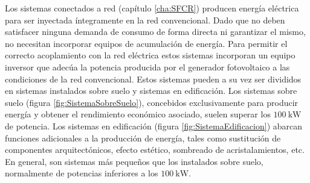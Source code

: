 Los sistemas conectados a red (capítulo \ref{cha:SFCR}) producen
energía eléctrica para ser inyectada íntegramente en la red convencional.
Dado que no deben satisfacer ninguna demanda de consumo de forma directa
ni garantizar el mismo, no necesitan incorporar equipos de acumulación
de energía. Para permitir el correcto acoplamiento con la red eléctrica
estos sistemas incorporan un equipo inversor que adecúa la potencia
producida por el generador fotovoltaico a las condiciones de la red
convencional. Estos sistemas pueden a su vez ser divididos en sistemas
instalados sobre suelo y sistemas en edificación. Los sistemas sobre
suelo (figura \ref{fig:SistemaSobreSuelo}), concebidos exclusivamente
para producir energía y obtener el rendimiento económico asociado,
suelen superar los $\SI{100}{\kilo\watt}$ de potencia. Los sistemas
en edificación (figura \ref{fig:SistemaEdificacion}) abarcan funciones
adicionales a la producción de energía, tales como sustitución de
componentes arquitectónicos, efecto estético, sombreado de acristalamientos,
etc. En general, son sistemas más pequeños que los instalados sobre
suelo, normalmente de potencias inferiores a los $\SI{100}{\kilo\watt}$.

